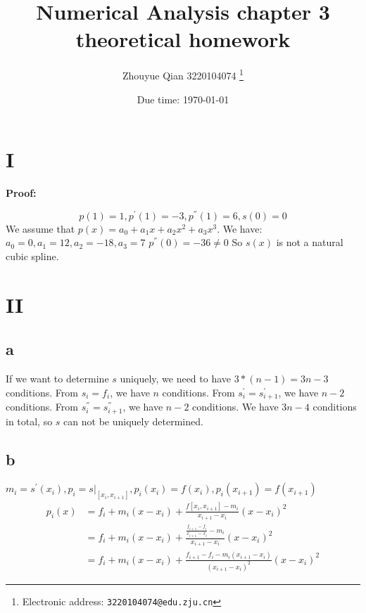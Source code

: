 \documentclass[a4paper]{article}
\begin{document}
\title{Numerical Analysis chapter 3 theoretical homework}

\author{Zhouyue Qian 3220104074
  \thanks{Electronic address: \texttt{3220104074@edu.zju.cn}}}


\date{Due time: \today}

\maketitle






\section*{I}
\textbf{Proof:}

\[p(1) =1, p^{'}(1)=-3,p^{''}(1)=6,s(0) =0\]
We assume that $p(x) = a_0 + a_1x + a_2x^2 + a_3x^3$.
We have: $a_0 = 0, a_1=12, a_2=-18, a_3=7$
$p^{''}(0)=-36\neq 0$
So $s(x)$ is not a natural cubic spline.

\section*{II}
\subsection*{a}
If we want to determine $s$ uniquely, we need to have $3*(n-1)=3n-3$ conditions.
From $s_i = f_i$, we have $n$ conditions.
From $s^{'}_i = s^{'}_{i+1}$, we have $n-2$ conditions.
From $s^{''}_i = s^{''}_{i+1}$, we have $n-2$ conditions.
We have $3n-4$ conditions in total, so $s$ can not be uniquely determined.

\subsection*{b}
$m_i = s^{'}(x_i), p_i = s|_{[x_i,x_{i+1}]},p_i(x_i)=f(x_i),p_i(x_{i+1})=f(x_{i+1})$
\begin{align*}
    p_i(x) &= f_i + m_i(x-x_i) + \frac{f[x_i,x_{i+1}]-m_i}{x_{i+1}-x_i}(x-x_i)^2 \\
           &= f_i + m_i(x-x_i) + \frac{\frac{f_{i+1}-f_i}{x_{i+1}-x_i}-m_i}{x_{i+1}-x_i}(x-x_i)^2\\
           &= f_i + m_i(x-x_i) + \frac{f_{i+1}-f_i-m_i(x_{i+1}-x_i)}{(x_{i+1}-x_i)^2}(x-x_i)^2
\end{align*}
\end{document}
